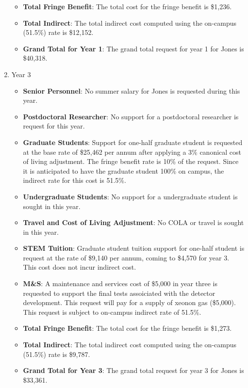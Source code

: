 \begin{enumerate}
\begin{itemize}[noitemsep,nolistsep]
\item {{\bf Total Fringe Benefit}: The total cost for the fringe benefit is \$1,236.}

\item {{\bf Total Indirect}: The total indirect cost computed using the on-campus (51.5\%) rate is \$12,152.}

\item {{\bf Grand Total for Year 1}: The grand total request for year 1 for Jones is \$40,318.}

\end{itemize}

\item{Year 3}
\begin{itemize}[noitemsep,nolistsep]
\item{{\bf Senior Personnel}: No summer salary for Jones is requested during this year.}

\item {{\bf Postdoctoral Researcher}:  No support for a postdoctoral researcher is request for this year.} 

\item{{\bf Graduate Students}: Support for one-half graduate student is requested at the base rate of \$25,462 per annum after applying a 3\% canonical cost of living adjustment.   The fringe benefit rate is 10\% of the request.  Since it is anticipated to have the graduate student 100\% on campus, the indirect rate for this cost is 51.5\%.}

\item {{\bf Undergraduate Students}: No support for a undergraduate student is sought in this year.}

\item{{\bf Travel and Cost of Living Adjustment}: No COLA or travel is sought in this year.}

\item {{\bf STEM Tuition}: Graduate student tuition support for one-half student is request at the rate of \$9,140 per annum, coming to \$4,570 for year 3.  This cost does not incur indirect cost.}

\item {{\bf M\&S}: A maintenance and services cost of \$5,000 in year three is requested to support the final tests assoiciated with the detector development. This request will pay for a supply of xeonon gas (\$5,000). This request is subject to on-campus indirect rate of 51.5\%.}

\item {{\bf Total Fringe Benefit}: The total cost for the fringe benefit is \$1,273.}

\item {{\bf Total Indirect}: The total indirect cost computed using the on-campus (51.5\%) rate is \$9,787.}

\item {{\bf Grand Total for Year 3}: The grand total request for year 3 for Jones is \$33,361.}

\end{itemize}
\end{enumerate}